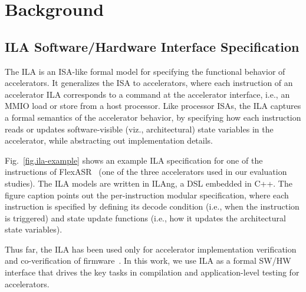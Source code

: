 \section{Background}
\label{sec.background}


\subsection{ILA Software/Hardware Interface Specification}
\label{sec:ila}
The ILA is an ISA-like formal model 
  for specifying the functional behavior of accelerators.
It generalizes the ISA to accelerators, 
  where each 
  instruction of an accelerator ILA corresponds 
  to a command at the accelerator interface, i.e., an MMIO load or store from a host processor.
Like processor ISAs, 
  the ILA captures a formal semantics of the accelerator behavior, by specifying how each instruction 
  reads or updates software-visible (viz., architectural) state variables in the accelerator,
  while abstracting out implementation details. 
  
Fig.~\ref{fig.ila-example} shows an example
  ILA specification for one of the instructions of FlexASR~\cite{tambe20219} (one of the three accelerators used in our evaluation studies). The ILA models are written in ILAng, a DSL embedded in C++. The figure caption points out the per-instruction modular specification, where each instruction is specified by defining its decode condition (i.e., when the instruction is triggered) and state update functions (i.e., how it updates
  the architectural state variables). 

Thus far, the ILA has been used only for accelerator implementation verification and co-verification of firmware~\cite{huang2018formal,huang2018instruction}.
In this work, we use ILA as a formal SW/HW interface that drives the key tasks in compilation and application-level testing for accelerators.

